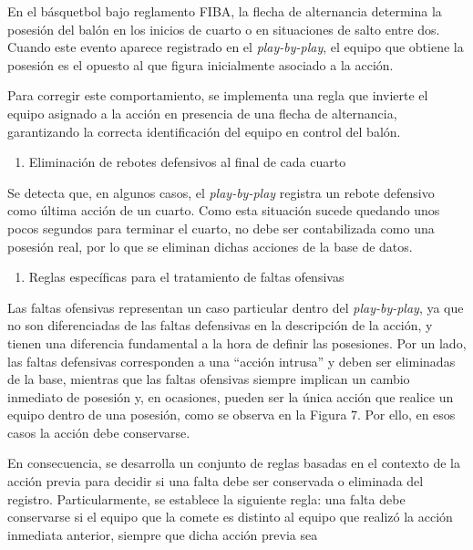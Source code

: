 \documentclass[
  12pt,
]{article}
\providecommand{\tightlist}{%
  \setlength{\itemsep}{0pt}\setlength{\parskip}{0pt}}
\begin{document}
En el básquetbol bajo reglamento FIBA, la flecha de alternancia
determina la posesión del balón en los inicios de cuarto o en
situaciones de salto entre dos. Cuando este evento aparece registrado en
el \emph{play-by-play}, el equipo que obtiene la posesión es el opuesto
al que figura inicialmente asociado a la acción.

Para corregir este comportamiento, se implementa una regla que invierte
el equipo asignado a la acción en presencia de una flecha de
alternancia, garantizando la correcta identificación del equipo en
control del balón.

\begin{enumerate}
\def\labelenumi{\arabic{enumi})}
\setcounter{enumi}{1}
\tightlist
\item
  Eliminación de rebotes defensivos al final de cada cuarto
\end{enumerate}

Se detecta que, en algunos casos, el \emph{play-by-play} registra un
rebote defensivo como última acción de un cuarto. Como esta situación
sucede quedando unos pocos segundos para terminar el cuarto, no debe ser
contabilizada como una posesión real, por lo que se eliminan dichas
acciones de la base de datos.

\begin{enumerate}
\def\labelenumi{\arabic{enumi})}
\setcounter{enumi}{2}
\tightlist
\item
  Reglas específicas para el tratamiento de faltas ofensivas
\end{enumerate}

Las faltas ofensivas representan un caso particular dentro del
\emph{play-by-play}, ya que no son diferenciadas de las faltas
defensivas en la descripción de la acción, y tienen una diferencia
fundamental a la hora de definir las posesiones. Por un lado, las faltas
defensivas corresponden a una ``acción intrusa'' y deben ser eliminadas
de la base, mientras que las faltas ofensivas siempre implican un cambio
inmediato de posesión y, en ocasiones, pueden ser la única acción que
realice un equipo dentro de una posesión, como se observa en la Figura
7. Por ello, en esos casos la acción debe conservarse.

En consecuencia, se desarrolla un conjunto de reglas basadas en el
contexto de la acción previa para decidir si una falta debe ser
conservada o eliminada del registro. Particularmente, se establece la
siguiente regla: una falta debe conservarse si el equipo que la comete
es distinto al equipo que realizó la acción inmediata anterior, siempre
que dicha acción previa sea
\end{document}
